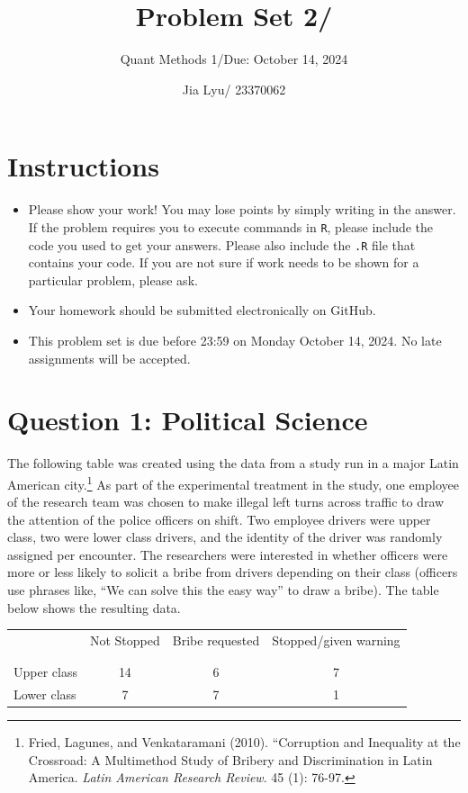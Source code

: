 \documentclass[12pt,letterpaper]{article}
\title{Problem Set 2/}
\date{Jia Lyu/ 23370062}
\author{Quant Methods 1/Due: October 14, 2024}
\begin{document}
	\maketitle
	\section*{Instructions}
\begin{itemize}
	\item Please show your work! You may lose points by simply writing in the answer. If the problem requires you to execute commands in \texttt{R}, please include the code you used to get your answers. Please also include the \texttt{.R} file that contains your code. If you are not sure if work needs to be shown for a particular problem, please ask.
	\item Your homework should be submitted electronically on GitHub.
	\item This problem set is due before 23:59 on Monday October 14, 2024. No late assignments will be accepted.

\end{itemize}

	
	\vspace{.5cm}
	\section*{Question 1: Political Science}
		\vspace{.25cm}
	The following table was created using the data from a study run in a major Latin American city.\footnote{Fried, Lagunes, and Venkataramani (2010). ``Corruption and Inequality at the Crossroad: A Multimethod Study of Bribery and Discrimination in Latin America. \textit{Latin American Research Review}. 45 (1): 76-97.} As part of the experimental treatment in the study, one employee of the research team was chosen to make illegal left turns across traffic to draw the attention of the police officers on shift. Two employee drivers were upper class, two were lower class drivers, and the identity of the driver was randomly assigned per encounter. The researchers were interested in whether officers were more or less likely to solicit a bribe from drivers depending on their class (officers use phrases like, ``We can solve this the easy way'' to draw a bribe). The table below shows the resulting data.

\newpage
\begin{table}[h!]
	\centering
	\begin{tabular}{l | c c c }
		& Not Stopped & Bribe requested & Stopped/given warning \\
		\\[-1.8ex] 
		\hline \\[-1.8ex]
		Upper class & 14 & 6 & 7 \\
		Lower class & 7 & 7 & 1 \\
		\hline
	\end{tabular}
\end{table}
\end{document}
